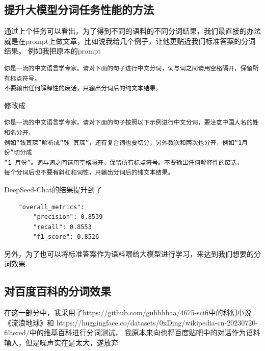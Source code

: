 \documentclass[11pt]{article}
\begin{document}
\subsection{提升大模型分词任务性能的方法}
通过上个任务可以看出，为了得到不同的语料的不同分词结果，我们最直接的办法就是在prompt上做文章，比如说我给几个例子，让他更贴近我们标准答案的分词结果。
例如我把原本的prompt
\begin{lstlisting}
你是一流的中文语言学专家。请对下面的句子进行中文分词，词与词之间请用空格隔开，保留所有标点符号。
不要输出任何解释性的废话，只输出分词后的纯文本结果。
\end{lstlisting}
修改成
\begin{lstlisting}
你是一流的中文语言学专家。请对下面的句子按照以下示例进行中文分词，要注意中国人名的姓和名分开，
例如“钱其琛”解析成“钱 其琛”，还有复合词也要切分，另外数次和两次也分开，例如“1月份”切分成
“1 月份”。词与词之间请用空格隔开，保留所有标点符号。不要输出任何解释性的废话，
每个分词后也不要有斜杠和词性，只输出分词后的纯文本结果。
\end{lstlisting}
DeepSeed-Chat的结果提升到了
\begin{lstlisting}
    "overall_metrics": 
        "precision": 0.8539
        "recall": 0.8553
        "f1_score": 0.8526
\end{lstlisting}
另外，为了也可以将标准答案作为语料喂给大模型进行学习，来达到我们想要的分词效果.
\subsection{对百度百科的分词效果}
在这一部分中，我采用了https://github.com/guhhhhaa/4675-scifi中的科幻小说《流浪地球》和
https://huggingface.co/datasets/0xDing/wikipedia-cn-20230720-filtered/中的维基百科进行分词测试，
我原本来向也将百度贴吧中的对话作为语料输入，但是噪声实在是太大，遂放弃\par
\end{document}
